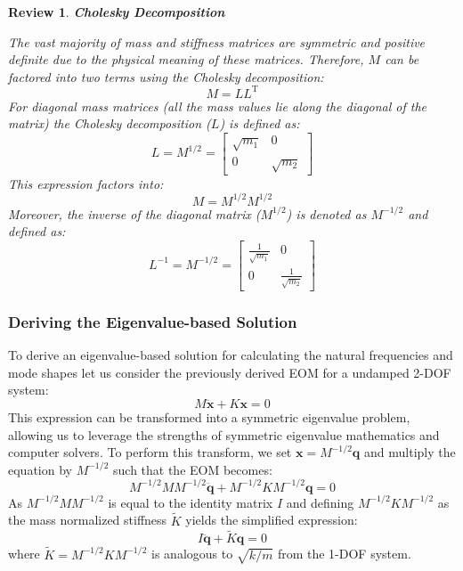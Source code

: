 \documentclass[12pt,letter]{article}
\numberwithin{ex}{section} %
\newtheorem{re}{Review}
\numberwithin{re}{section} %
\newenvironment{review}{\begin{mdframed}[middlelinewidth=2mm,roundcorner=20pt]\begin{re}\normalfont}{\end{re}\end{mdframed}}
\begin{document}
\begin{review}

\textbf{Cholesky Decomposition} 

The vast majority of mass and stiffness matrices are symmetric and positive definite due to the physical meaning of these matrices. Therefore, $M$ can be factored into two terms using the Cholesky decomposition:
\begin{equation}
	M=LL^{\text{T}}
\end{equation}
For diagonal mass matrices (all the mass values lie along the diagonal of the matrix) the Cholesky decomposition ($L$) is defined as:
\begin{equation}
	L = M^{1/2} = \begin{bmatrix} \sqrt{m_1} & 0 \\  0  & \sqrt{m_2} \end{bmatrix} 
\end{equation}
This expression factors into:
\begin{equation}
	M = M^{1/2}M^{1/2}
\end{equation}
Moreover, the inverse of the diagonal matrix ($M^{1/2}$) is denoted as $M^{-1/2}$ and defined as:
\begin{equation}
	L^{-1} = M^{-1/2} = \begin{bmatrix} \frac{1}{\sqrt{m_1}} & 0 \\  0  & \frac{1}{\sqrt{m_2}} \end{bmatrix} 
\end{equation}
\end{review}


\subsubsection{Deriving the Eigenvalue-based Solution}
 
To derive an eigenvalue-based solution for calculating the natural frequencies and mode shapes let us consider the previously derived EOM for a undamped 2-DOF system:
\begin{equation}
M\mathbf{\ddot{x}} + K\mathbf{x} =0
\end{equation}
This expression can be transformed into a symmetric eigenvalue problem, allowing us to leverage the strengths of symmetric eigenvalue mathematics and computer solvers. To perform this transform, we set $\mathbf{x}=M^{-1/2}\mathbf{q}$ and multiply the equation by $M^{-1/2}$ such that the EOM becomes:
\begin{equation}
M^{-1/2}MM^{-1/2}\mathbf{\ddot{q}} + M^{-1/2}KM^{-1/2}\mathbf{q} =0
\end{equation}
As $M^{-1/2}MM^{-1/2}$ is equal to the identity matrix $I$ and defining $M^{-1/2}KM^{-1/2}$ as the mass normalized stiffness $\widetilde{K}$ yields the simplified expression:
\begin{equation}
I\mathbf{\ddot{q}} + \widetilde{K}\mathbf{q} =0
\end{equation}
where $\widetilde{K}=M^{-1/2}KM^{-1/2}$ is analogous to $\sqrt{k/m}$ from the 1-DOF system. 
\end{document}
